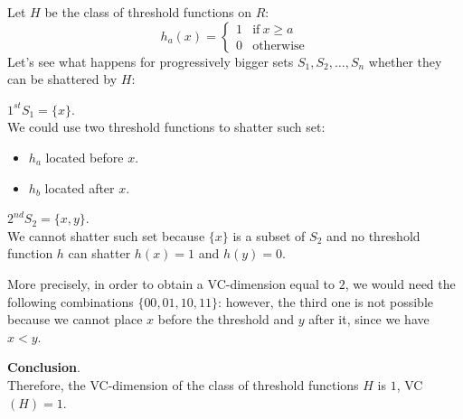 \begin{example}[title = {Threshold Functions on $\mathbb{R}$}]
    Let $H$ be the class of threshold functions on $R$:
    $$h_a(x) = \begin{cases} 1 & \text{if} \ x \geq a \\ 0 & \text{otherwise} \end{cases}$$
    Let's see what happens for progressively bigger sets $S_1, S_2, \dots, S_n$ whether they can be shattered by $H$: \vspace{7pt}

    $1^{st} S_1 = \{x\}$. \\
    We could use two threshold functions to shatter such set:
    \begin{itemize}
        \renewcommand{\labelitemi}{-}
        \item $h_a$ located before $x$.
        \item $h_b$ located after $x$.
    \end{itemize} \vspace{3.5pt}

    $2^{nd} S_2 = \{x, y\}$. \\
    We cannot shatter such set because $\{x\}$ is a subset of $S_2$ and no threshold function $h$ can shatter $h(x) = 1$ and $h(y) = 0$. \vspace{3.5pt}

    More precisely, in order to obtain a VC-dimension equal to $2$, we would need the following combinations $\{00, 01, 10, 11\}$: however, the third one
    is not possible because we cannot place $x$ before the threshold and $y$ after it, since we have $x < y$. \vspace{7pt}

    \textbf{Conclusion}. \\
    Therefore, the VC-dimension of the class of threshold functions $H$ is $1$, VC$(H) = 1$.
\end{example}
